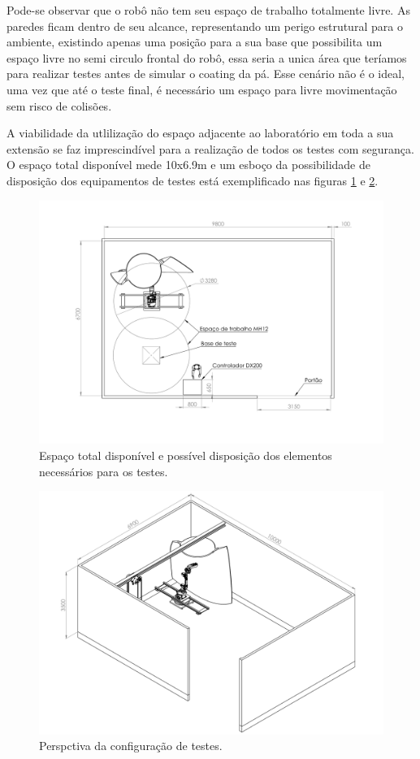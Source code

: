 Pode-se observar que o robô não tem seu espaço de trabalho totalmente livre. As
paredes ficam dentro de seu alcance, representando um perigo estrutural
para o ambiente,  existindo apenas uma posição para a sua base que possibilita
um espaço livre no semi circulo frontal do robô, essa seria a unica área que teríamos para realizar testes 
antes de simular o coating da pá. Esse cenário não é o ideal, uma vez que até o teste final, 
é necessário um espaço para livre movimentação sem risco de colisões.

A viabilidade da utlilização do espaço adjacente ao laboratório em toda a sua
extensão se faz imprescindível para a realização de todos os testes com
segurança. O espaço total disponível mede 10x6.9m e um esboço da possibilidade
de disposição dos equipamentos de testes está exemplificado nas figuras
\ref{fig::planta_grande} e \ref{fig::planta_perspectiva}.

\begin{figure}[h!]
\centering
	\includegraphics[width=0.9\columnwidth]{figs/espaco/Montagem_Base_LEAD_1}
	\caption{Espaço total disponível e possível disposição dos elementos
	necessários para os testes.}
	\label{fig::planta_grande}
\end{figure}

\begin{figure}[H]
\centering
	\includegraphics[width=0.9\columnwidth]{figs/espaco/Montagem_Base_LEAD_2}
	\caption{Perspctiva da configuração de testes.}
	\label{fig::planta_perspectiva}
\end{figure}

